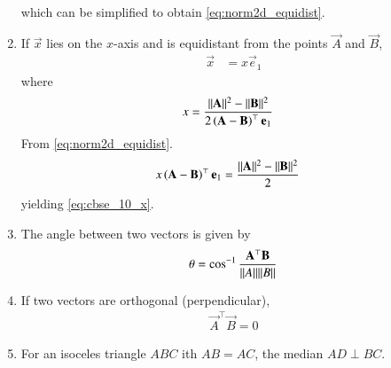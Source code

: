 \begin{enumerate}[label=\thesection.\arabic*.,ref=\thesection.\theenumi]
\begin{multline}
\end{multline}
which can be simplified to obtain
  \eqref{eq:norm2d_equidist}.
\item If $\vec{x}$ lies on the  $x$-axis and is  equidistant from the points $\vec{A}$ and $\vec{B}$, 
  \begin{align}
	  \vec{x} &=
	   x\vec{e}_1
  \end{align}
  where 
  \begin{align}
	  x &=\frac{\lVert\mathbf{A}\rVert^2 -\lVert\mathbf{B}\rVert^2 }{2\left(\mathbf{A}-\mathbf{B}\right)^{\top }\mathbf{e}_1
}
	  \label{eq:cbse_10_x}
  \end{align}
  \solution 
  From \eqref{eq:norm2d_equidist}.
  \begin{align}
	   x\left(\mathbf{A}-\mathbf{B}\right)^{\top }\mathbf{e}_1
		  &=
	  \frac{\lVert\mathbf{A}\rVert^2 -\lVert\mathbf{B}\rVert^2 }{2}
   \end{align}
	  yielding \eqref{eq:cbse_10_x}.
  \item The angle between two vectors is given by 
    \label{prop:angle2d}
  \begin{align}
    \theta = \cos^{-1}\frac{\mathbf{A}^{\top} \mathbf{B}}{\lVert A\rVert\lVert B\rVert}
  \end{align}
  \item If two vectors are orthogonal (perpendicular), 
  \begin{align}
    \label{eq:angle2d_orth}
\vec{A}^{\top} \vec{B} = 0
  \end{align}
  \item For an isoceles triangle $ABC$ ith $AB = AC$, the median $AD \perp BC$.
    \label{prop:two-isosc}


\end{enumerate}

